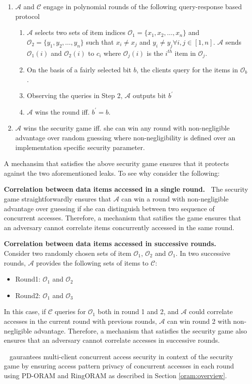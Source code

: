 \begin{enumerate}
\item $\mathcal{A}$ and $\mathcal{C}$ engage in polynomial rounds of the following query-response based protocol
\begin{enumerate}
  \item $\mathcal{A}$ selects two sets of item indices $\mathcal{O}_{1} = \{x_1,x_2, \ldots,x_n\}$ and $\mathcal{O}_{2} = \{y_1,y_2, \ldots,y_n\}$ such that 
 $x_i \neq x_j$ and $y_i \neq y_j \forall i,j \in [1,n]$. 
 $\mathcal{A}$ sends $\mathcal{O}_{1}(i)$ and $\mathcal{O}_{2}(i)$ to $c_{i}$ where $\mathcal{O}_{j}(i)$ is the $i^{th}$ item in $\mathcal{O}_{j}$. 
 \item On the basis of a fairly selected bit $b$, the clients query for the items in $\mathcal{O}_{b}$.
 \item Observing the queries in Step 2, $\mathcal{A}$ outputs bit $b^{'}$
 \item $\mathcal{A}$ wins the round iff. $b^{'} = b$. 
 \end{enumerate}
 \item $\mathcal{A}$ wins the security game iff. she can win any round with non-negligible advantage over random guessing where non-negligibility is defined 
 over an implementation specific security parameter.
 \end{enumerate}

A mechansim that satisfies the above security game ensures that it protects against the two aforementioned leaks. To see why consider the following: 

{\bf Correlation between data items accessed in a single round.~}
%
The security game straightforwardly ensures that $\mathcal{A}$ can win a round with non-negligible advantage over guessing if she can 
distinguish between two sequence of concurrent accesses. Therefore, a mechanism that satifies the game ensures that an adversary cannot correlate 
items concurrently accessed in the same round. 

{\bf Correlation between data items accessed in successive rounds.~}
Consider two randomly chosen sets of item $\mathcal{O}_{1}$, $\mathcal{O}_{2}$ and $\mathcal{O}_{1}$. In two successive rounds, $\mathcal{A}$ provides the following 
sets of items to $\mathcal{C}$:

\begin{itemize}
 \item Round1: $\mathcal{O}_{1}$ and $\mathcal{O}_{2}$
 \item Round2: $\mathcal{O}_{1}$ and $\mathcal{O}_{3}$
 \end{itemize}

In this case, if $\mathcal{C}$ queries for $\mathcal{O}_{1}$ both in round 1 and 2, and $\mathcal{A}$ could correlate accesses in the current round 
with previous rounds, $\mathcal{A}$ can win round 2 with non-negligible advantage. Therefore, a mechanism that satisfies the security game also ensures that 
an adversary cannot correlate accesses in successive rounds.

\sysname~ gaurantees multi-client concurrent access security in context of the security game by ensuring access pattern privacy of concurrent accesses 
in each round using PD-ORAM and RingORAM as described in Section \ref{oram:overview}.